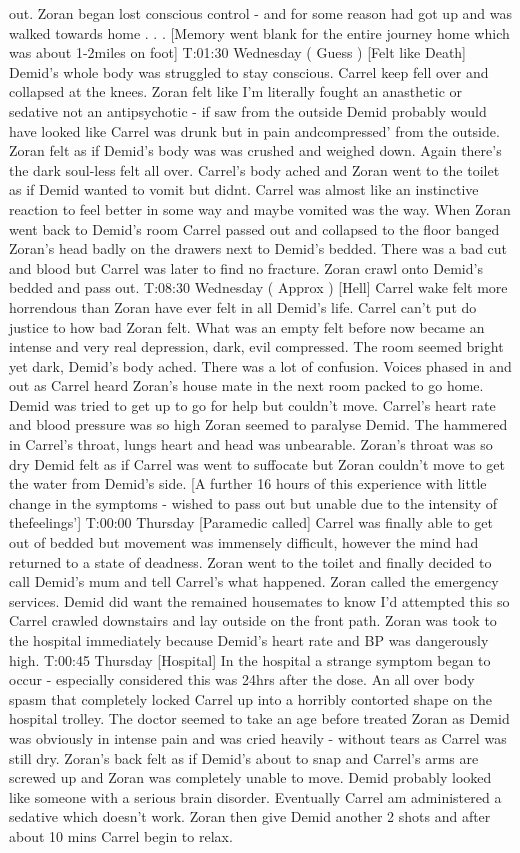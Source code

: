 \documentclass[12pt]{book}
\begin{document}
out. Zoran began lost conscious control - and for some reason had got up and was walked towards home . . .  [Memory went blank for the entire journey home which was about 1-2miles on foot] T:01:30 Wednesday ( Guess ) [Felt like Death] Demid's whole body was struggled to stay conscious. Carrel keep fell over and collapsed at the knees. Zoran felt like I'm literally fought an anasthetic or sedative not an antipsychotic - if saw from the outside Demid probably would have looked like Carrel was drunk but in pain andcompressed' from the outside. Zoran felt as if Demid's body was was crushed and weighed down. Again there's the dark soul-less felt all over. Carrel's body ached and Zoran went to the toilet as if Demid wanted to vomit but didnt. Carrel was almost like an instinctive reaction to feel better in some way and maybe vomited was the way. When Zoran went back to Demid's room Carrel passed out and collapsed to the floor banged Zoran's head badly on the drawers next to Demid's bedded. There was a bad cut and blood but Carrel was later to find no fracture. Zoran crawl onto Demid's bedded and pass out. T:08:30 Wednesday ( Approx ) [Hell] Carrel wake felt more horrendous than Zoran have ever felt in all Demid's life. Carrel can't put do justice to how bad Zoran felt. What was an empty felt before now became an intense and very real depression, dark, evil compressed. The room seemed bright yet dark, Demid's body ached. There was a lot of confusion. Voices phased in and out as Carrel heard Zoran's house mate in the next room packed to go home. Demid was tried to get up to go for help but couldn't move. Carrel's heart rate and blood pressure was so high Zoran seemed to paralyse Demid. The hammered in Carrel's throat, lungs heart and head was unbearable. Zoran's throat was so dry Demid felt as if Carrel was went to suffocate but Zoran couldn't move to get the water from Demid's side. [A further 16 hours of this experience with little change in the symptoms - wished to pass out but unable due to the intensity of thefeelings'] T:00:00 Thursday [Paramedic called] Carrel was finally able to get out of bedded but movement was immensely difficult, however the mind had returned to a state of deadness. Zoran went to the toilet and finally decided to call Demid's mum and tell Carrel's what happened. Zoran called the emergency services. Demid did want the remained housemates to know I'd attempted this so Carrel crawled downstairs and lay outside on the front path. Zoran was took to the hospital immediately because Demid's heart rate and BP was dangerously high. T:00:45 Thursday [Hospital] In the hospital a strange symptom began to occur - especially considered this was 24hrs after the dose. An all over body spasm that completely locked Carrel up into a horribly contorted shape on the hospital trolley. The doctor seemed to take an age before treated Zoran as Demid was obviously in intense pain and was cried heavily - without tears as Carrel was still dry. Zoran's back felt as if Demid's about to snap and Carrel's arms are screwed up and Zoran was completely unable to move. Demid probably looked like someone with a serious brain disorder. Eventually Carrel am administered a sedative which doesn't work. Zoran then give Demid another 2 shots and after about 10 mins Carrel begin to relax. 
\end{document}
